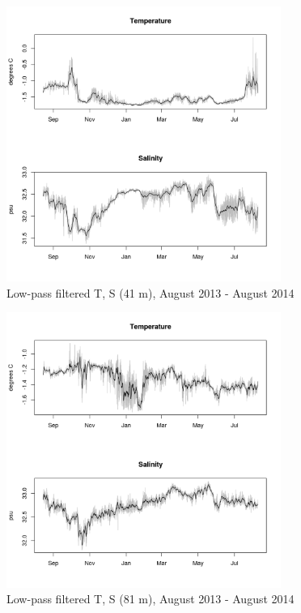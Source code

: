 \documentclass[12pt]{dforeport}
\begin{document}
\begin{figure}  
\centering
\includegraphics[width = 0.8\textwidth]{./figures/25_lpf_TS_41m_2013_2014.png}
\caption[Low-pass filtered T, S (41 m), 2013-2014]{Low-pass filtered T, S (41 m), August 2013 - August 2014}
\label{f:ctd_41_lpf_2013_2014}
\end{figure}

\begin{figure}  
\centering
\includegraphics[width = 0.8\textwidth]{./figures/26_lpf_TS_81m_2013_2014.png}
\caption[Low-pass filtered T, S (81 m), 2013-2014]{Low-pass filtered T, S (81 m), August 2013 - August 2014}
\label{f:ctd_81_lpf_2013_2014}
\end{figure}
\end{document}
